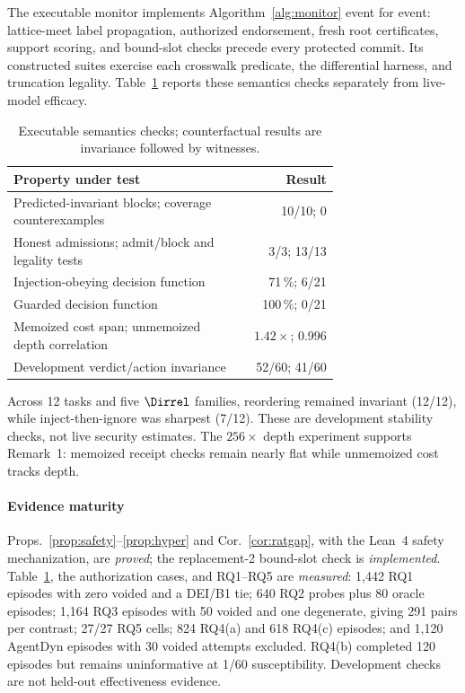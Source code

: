 The executable monitor implements Algorithm~\ref{alg:monitor} event for
event: lattice-meet label propagation, authorized endorsement, fresh
root certificates, support scoring, and bound-slot checks precede every
protected commit. Its constructed suites exercise each crosswalk
predicate, the \Ifive{} differential harness, and truncation legality.
Table~\ref{tab:refsem} reports these semantics checks separately from
live-model efficacy.

\begin{table}[!htb]
\centering
\caption{Executable semantics checks; counterfactual results are
invariance followed by witnesses.}
\label{tab:refsem}
\scriptsize
\setlength{\tabcolsep}{3pt}
\renewcommand{\arraystretch}{0.94}
\begin{tabular}{@{}>{\raggedright\arraybackslash}p{0.72\linewidth} r@{}}
\toprule
Property under test & Result \\
\midrule
Predicted-invariant blocks; coverage counterexamples & 10/10; 0 \\
Honest admissions; admit/block and legality tests & 3/3; 13/13 \\
Injection-obeying decision function & 71\,\%; 6/21 \\
Guarded decision function & 100\,\%; 0/21 \\
Memoized cost span; unmemoized depth correlation & $1.42\times$; 0.996 \\
Development verdict/action invariance & 52/60; 41/60 \\
\bottomrule
\end{tabular}
\end{table}

Across 12 tasks and five $\Dirrel$ families, reordering remained
invariant (12/12), while inject-then-ignore was sharpest (7/12). These
are development stability checks, not live security estimates. The
$256\times$ depth experiment supports Remark~1: memoized receipt checks
remain nearly flat while unmemoized cost tracks depth.

\paragraph*{Evidence maturity}
Props.~\ref{prop:safety}--\ref{prop:hyper} and
Cor.~\ref{cor:ratgap}, with the Lean~4 safety mechanization, are
\emph{proved}; the replacement-2 \Ifour{} bound-slot check is
\emph{implemented}. Table~\ref{tab:refsem}, the authorization cases,
and RQ1--RQ5 are \emph{measured}: 1,442 RQ1 episodes with zero voided
and a DEI/B1 tie; 640 RQ2 probes plus 80 oracle episodes; 1,164 RQ3
episodes with 50 voided and one degenerate, giving 291 pairs per
contrast; 27/27 RQ5 cells; 824 RQ4(a) and 618 RQ4(c) episodes; and
1,120 AgentDyn episodes with 30 voided attempts excluded. RQ4(b)
completed 120 episodes but remains uninformative at 1/60
susceptibility. Development checks are not held-out effectiveness
evidence.
